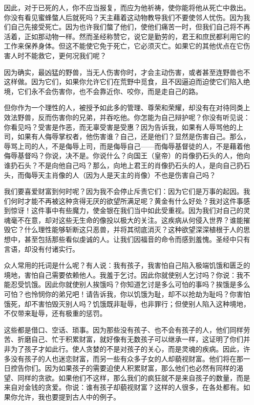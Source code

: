 因此，对于已死的人，你不应当报复，而应为他祈祷，使你能将他从死亡中救出。你没有看见蜜蜂螫人后就死吗？天主藉着这动物教导我们不要使邻人忧伤。因为我们自己先接受死亡。因为也许我们螫了他们，使他们痛苦一时，但我们自己将不再活着，正如那动物一样。然而圣经称赞它，说它是勤劳的，君王和庶民都利用它的工作来保养身体。但这不能使它免于死亡，它必须灭亡。如果它的其他优点在它伤害人时不能救它，更何况我们呢？\par

因为确实，最凶猛的野兽，当无人伤害你时，才会主动伤害，或者甚至连野兽也不这样做。因为它们，如果你允许它们在荒野中觅食，且不因逼迫而迫使它们陷入绝境，它们永不会伤害你，也不会靠近你、咬你，而是走自己的路。\par

但你作为一个理性的人，被授予如此多的管理、尊荣和荣耀，却没有在对待同类上效法野兽，反而伤害你的兄弟，并吞吃他。你怎能为自己辩护呢？你没有听见说：你看见吗？受害是作恶，而无辜受害是受惠？因为告诉我，如果有人辱骂他的上司，如果有人侮辱掌权者，他伤害谁？自己，还是他们？显然是伤害自己。那么，辱骂上司的人，不是侮辱上司，而是侮辱自己——而侮辱基督徒的人，不是藉着他侮辱基督吗？你说，决不是。你说什么？向国王（皇帝）的肖像扔石头的人，他向谁扔石头？不是向他自己吗？那么，向地上君王的肖像扔石头的人，是向自己扔石头，而侮辱天主肖像的人（因为人是天主的肖像）不也是伤害自己吗？\par

我们要喜爱财富到何时呢？因为我不会停止斥责它们：因为它们是万事的起因。我们何时才能不再被这种贪得无厌的欲望所满足呢？黄金有什么好处？我对这件事感到惊讶！这件事中有些魔力，使金银在我们当中如此受重视。因为我们对自己的灵魂毫不在意，却对这些无生命的像投以极大的关注。这疾病从何侵入世界？谁能摧毁它？什么理性能够斩断这只恶兽，并将其彻底消灭？这种欲望深深植根于人的思想中，甚至包括那些看似虔诚的人。让我们因福音的命令而感到羞愧。圣经中只有言语，却没有付诸实行。\par

众人常用的托词是什么呢？有人说：我有孩子，我害怕自己陷入极端饥饿和匮乏的境地，害怕自己需要依赖他人。我羞于乞讨。因此你就使别人乞讨吗？你说：我不能忍受饥饿。因此你就使别人挨饿吗？你知道乞讨是多么可怕的事吗？挨饿是多么可怕？也怜悯你的弟兄吧！请告诉我，你以饥饿为耻，却不以抢劫为耻吗？你害怕饿死，却不害怕毁灭别人吗？饥饿既非耻辱，也非罪行；但使别人陷入这种境地，不仅带来耻辱，还有极重的惩罚。\par

这些都是借口、空话、琐事。因为那些没有孩子、也不会有孩子的人，他们同样劳苦、折磨自己、忙于积累财富，就好像有无数孩子可以继承一样，这证明了你们并非为了孩子才如此行。使人贪婪的不是对孩子的关心，而是灵魂的疾病。因此，许多没有孩子的人也迷恋财富，而另一些有众多子女的人却藐视财富。他们将在那一日控告你们。因为如果孩子的需要迫使人积累财富，那么他们也必然有同样的渴望、同样的贪欲。如果他们不这样，那么我们的疯狂就不是来自孩子的数量，而是来自对金钱的贪爱。你说：谁有孩子却藐视财富？这样的人很多，在各处都有。如果你允许，我也要提到古人中的例子。\par

